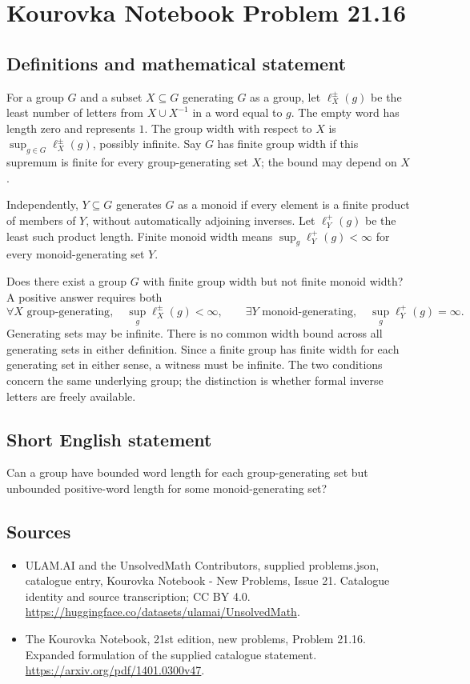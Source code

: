 \documentclass[11pt,a4paper]{article}
\begin{document}
\section*{Kourovka Notebook Problem 21.16}\label{statement}

\subsection{Definitions and mathematical statement}
For a group $G$ and a subset $X\subseteq G$ generating $G$ as a group,
let $\ell_X^{\pm}(g)$ be the least number of letters from
$X\cup X^{-1}$ in a word equal to $g$. The empty word has length zero
and represents $1$. The group width with respect to $X$ is
$\sup_{g\in G}\ell_X^{\pm}(g)$, possibly infinite.
Say $G$ has finite group width if this supremum is finite for every
group-generating set $X$; the bound may depend on $X$.

Independently, $Y\subseteq G$ generates $G$ as a monoid if every element
is a finite product of members of $Y$, without automatically adjoining
inverses. Let $\ell_Y^+(g)$ be the least such product length. Finite monoid
width means $\sup_g\ell_Y^+(g)<\infty$ for every monoid-generating set $Y$.

Does there exist a group $G$ with finite group width but not finite
monoid width? A positive answer requires both
\[
 \forall X\text{ group-generating},\quad\sup_g\ell_X^{\pm}(g)<\infty,
 \qquad
 \exists Y\text{ monoid-generating},\quad\sup_g\ell_Y^+(g)=\infty.
\]
Generating sets may be infinite. There is no common width bound across
all generating sets in either definition. Since a finite group has
finite width for each generating set in either sense, a witness must
be infinite. The two conditions concern the same underlying group;
the distinction is whether formal inverse letters are freely available.
\subsection{Short English statement}
Can a group have bounded word length for each group-generating set but unbounded positive-word length for some monoid-generating set?
\subsection{Sources}
\begin{itemize}
\item[S1] ULAM.AI and the UnsolvedMath Contributors, supplied problems.json, catalogue entry, Kourovka Notebook - New Problems, Issue 21. Catalogue identity and source transcription; CC BY 4.0.
\url{https://huggingface.co/datasets/ulamai/UnsolvedMath}.
\item[S2] The Kourovka Notebook, 21st edition, new problems, Problem 21.16. Expanded formulation of the supplied catalogue statement.
\url{https://arxiv.org/pdf/1401.0300v47}.
\end{itemize}
\end{document}
